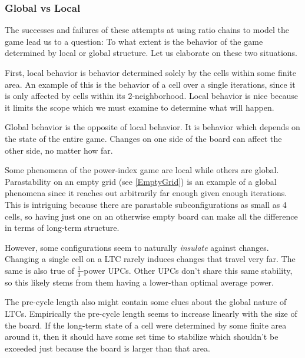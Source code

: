 \documentclass[12pt]{article}
\theoremstyle{definition}
\theoremstyle{remark}
\theoremstyle{remark}
\begin{document}
\subsubsection{Global vs Local} \label{GlobalLocal}
\par
The successes and failures of these attempts at using ratio chains to model the game lead us to a question: To what extent is the behavior of the game determined by local or global structure. Let us elaborate on these two situations.

\par
First, local behavior is behavior determined solely by the cells within some finite area. An example of this is the behavior of a cell over a single iterations, since it is only affected by cells within its 2-neighborhood. Local behavior is nice because it limits the scope which we must examine to determine what will happen.

\par
Global behavior is the opposite of local behavior. It is behavior which depends on the state of the entire game. Changes on one side of the board can affect the other side, no matter how far.

\par
Some phenomena of the power-index game are local while others are global. Parastability on an empty grid (see \ref{EmptyGrid}) is an example of a global phenomena since it reaches out arbitrarily far enough given enough iterations. This is intriguing because there are parastable subconfigurations as small as 4 cells, so having just one on an otherwise empty board can make all the difference in terms of long-term structure. %

\par
However, some configurations seem to naturally \emph{insulate} against changes. Changing a single cell on a LTC rarely induces changes that travel very far. The same is also true of $\frac{1}{3}$-power UPCs. Other UPCs don't share this same stability, so this likely stems from them having a lower-than optimal average power.

\par
The pre-cycle length also might contain some clues about the global nature of LTCs. Empirically the pre-cycle length seems to increase linearly with the size of the board. If the long-term state of a cell were determined by some finite area around it, then it should have some set time to stabilize which shouldn't be exceeded just because the board is larger than that area.
\end{document}
